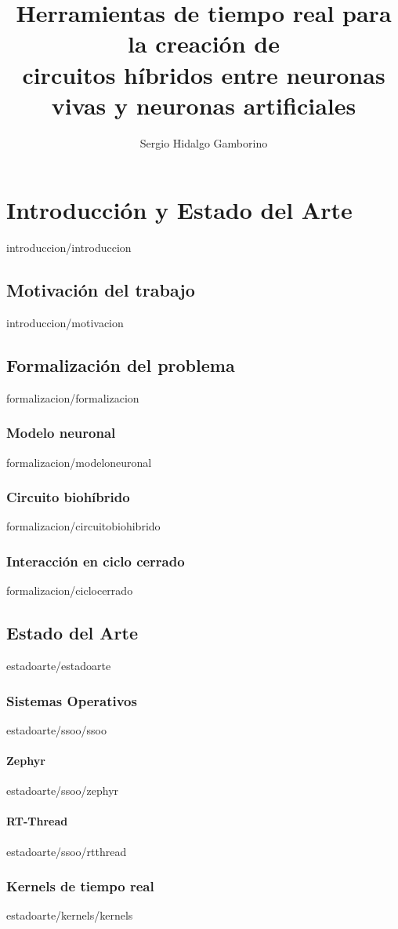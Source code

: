 \documentclass[epsbased,copyright,final,printable,covers,extendedindex,firstnumbered,tfg,gnuplot]{tfgtfmthesisuam}
\title{Herramientas de tiempo real para la creación de\\ circuitos híbridos entre neuronas vivas y neuronas artificiales}
\author{Sergio Hidalgo Gamborino}
\begin{document}
\chapter{Introducción y Estado del Arte\label{CAP:INTRODUCCIONYESTADOARTE}}{introduccion/introduccion}
  \section{Motivación del trabajo\label{SEC:MOTIVACION}}{introduccion/motivacion}
  \section{Formalización del problema\label{SEC:FORMALIZACION}}{formalizacion/formalizacion}
    \subsection{Modelo neuronal\label{SS:MODELONEURONAL}}{formalizacion/modeloneuronal}
    \subsection{Circuito biohíbrido\label{SS:CIRCUITOBIOHIBRIDO}}{formalizacion/circuitobiohibrido}
    \subsection{Interacción en ciclo cerrado\label{SS:CICLOCERRADO}}{formalizacion/ciclocerrado}
  \section{Estado del Arte\label{SEC:ESTADODELARTE}}{estadoarte/estadoarte}
    \subsection{Sistemas Operativos\label{SS:SSOO}}{estadoarte/ssoo/ssoo}
      \subsubsection{Zephyr\label{SSS:ZEPHYR}}{estadoarte/ssoo/zephyr}
      \subsubsection{RT-Thread\label{SSS:RTTHREAD}}{estadoarte/ssoo/rtthread}
    \subsection{Kernels de tiempo real\label{SS:KERNELS}}{estadoarte/kernels/kernels}
\end{document}
